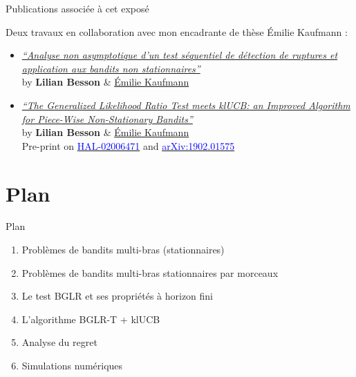 \documentclass[11pt,french,ignorenonframetext,]{beamer}
\begin{document}
\begin{frame}{Publications associée à cet exposé}

  Deux travaux en collaboration avec mon encadrante de thèse Émilie Kaufmann
  \dInnocey{} :

  \begin{itemize}
    \item
      \href{https://hal.inria.fr/hal-02006471/document}{\emph{``Analyse non asymptotique d'un test séquentiel de détection de ruptures et application aux bandits non stationnaires''}}\\
      by \textbf{Lilian Besson} \&
      \href{http://chercheurs.lille.inria.fr/ekaufman/research.html}{Émilie
      Kaufmann}

    \vspace*{30pt}

    \item
      \href{https://hal.inria.fr/hal-02006471/document}{\emph{``The Generalized Likelihood Ratio Test meets klUCB: an Improved Algorithm for Piece-Wise Non-Stationary Bandits''}}\\
      by \textbf{Lilian Besson} \&
      \href{http://chercheurs.lille.inria.fr/ekaufman/research.html}{Émilie
      Kaufmann}\\
      Pre-print on
      \href{https://hal.inria.fr/hal-02006471}{\textcolor{blue}{HAL-02006471}}
      and
      \href{https://arxiv.org/abs/1902.01575}{\textcolor{blue}{arXiv:1902.01575}}

  \end{itemize}

\end{frame}


\section{\hfill{}Plan\hfill{}}

\begin{frame}{Plan}

  \begin{enumerate}
    \item
      Problèmes de bandits multi-bras (stationnaires)
    \vspace*{15pt}

    \item
      Problèmes de bandits multi-bras stationnaires par morceaux
    \vspace*{15pt}

    \item
      Le test BGLR et ses propriétés à horizon fini
    \vspace*{15pt}

    \item
      L'algorithme BGLR-T + klUCB
    \vspace*{15pt}

    \item
      Analyse du regret
    \vspace*{15pt}

    \item
      Simulations numériques
  \end{enumerate}

\end{frame}
\end{document}
